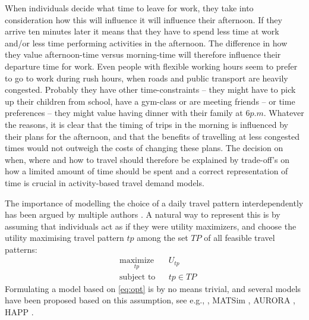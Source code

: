 When individuals decide what time to leave for work, they take into consideration how this will influence it will influence their afternoon. If they arrive ten minutes later it means that they have to spend less time at work and/or less time performing activities in the afternoon. The difference in how they value afternoon-time versus morning-time will therefore influence their departure time for work. Even people with flexible working hours seem to prefer to go to work during rush hours, when roads and public transport are heavily congested. Probably they have other time-constraints -- they might have to pick up their children from school, have a gym-class or are meeting friends -- or time preferences -- they might value having dinner with their family at $6\unit{p.m}$. Whatever the reasons, it is clear that the timing of trips in the morning is influenced by their plans for the afternoon, and that the benefits of travelling at less congested times would not outweigh the costs of changing these plans. The decision on when, where and how to travel should therefore be explained by trade-off's on how a limited amount of time should be spent and a correct representation of time is crucial in activity-based travel demand models. 

The importance of modelling the choice of a daily travel pattern interdependently has been argued by multiple authors \citep[see, e.g.,][]{recker86starchild1,kitamura1996Sams}. A natural way to represent this is by assuming that individuals act as if they were utility maximizers, and choose the utility maximising travel pattern $tp$ among the set $TP$ of all feasible travel patterns:
\begin{equation}
\label{eq:opt}
	\begin{aligned}
	& \underset{tp}{\text{maximize}}
	& & U_{tp} \\
	& \text{subject to}
	& & tp \in TP
\end{aligned}
\end{equation}
Formulating a model based on \eqref{eq:opt} is by no means trivial, and several models have been proposed based on this assumption, see e.g., \citet{Adler79}, MATSim \citep{horni2016multi}, AURORA \citep{joh2003Aurora, johEstimationAurora2005}, HAPP \citep{recker01bridge,Recker13,yuan2014HAPP}. 

